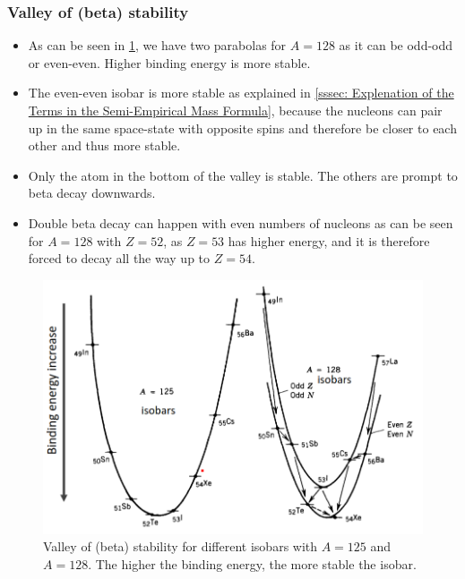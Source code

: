 \subsubsection{Valley of (beta) stability}
\begin{itemize}
    \item As can be seen in \cref{fig: valley_beta_stability}, we have two parabolas for $A = 128$ as it can be odd-odd or even-even. Higher binding energy is more stable.
    \item The even-even isobar is more stable as explained in \cref{sssec: Explenation of the Terms in the Semi-Empirical Mass Formula}, because the nucleons can pair up in the same space-state with opposite spins and therefore be closer to each other and thus more stable.
    \item Only the atom in the bottom of the valley is stable. The others are prompt to beta decay downwards. 
    \item Double beta decay can happen with even numbers of nucleons as can be seen for $A = 128$ with $Z = 52$, as $Z = 53$ has higher energy, and it is therefore forced to decay all the way up to $Z = 54$. 
\end{itemize}
\begin{figure}[h!]
\centering
\includegraphics[width = .6\textwidth]{valley_beta_stability.png}
\caption{Valley of (beta) stability for different isobars with $A = 125$ and $A = 128$. The higher the binding energy, the more stable the isobar.}
\label{fig: valley_beta_stability}
\end{figure}

